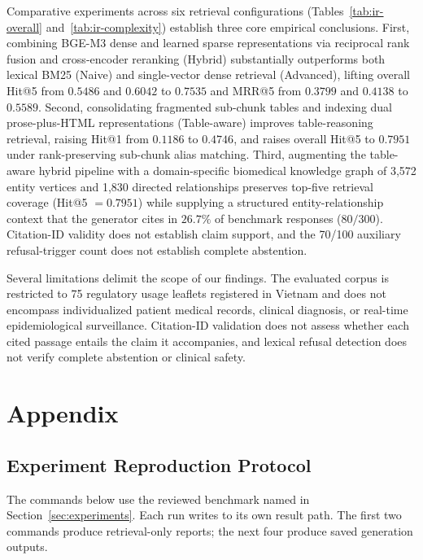 \documentclass[sn-mathphys, oneside]{sn-jnl}
\begin{document}
Comparative experiments across six retrieval configurations (Tables~\ref{tab:ir-overall} and~\ref{tab:ir-complexity}) establish three core empirical conclusions. First, combining BGE-M3 dense and learned sparse representations via reciprocal rank fusion and cross-encoder reranking (Hybrid) substantially outperforms both lexical BM25 (Naive) and single-vector dense retrieval (Advanced), lifting overall Hit@5 from $0.5486$ and $0.6042$ to $0.7535$ and MRR@5 from $0.3799$ and $0.4138$ to $0.5589$. Second, consolidating fragmented sub-chunk tables and indexing dual prose-plus-HTML representations (Table-aware) improves table-reasoning retrieval, raising Hit@1 from $0.1186$ to $0.4746$, and raises overall Hit@5 to $0.7951$ under rank-preserving sub-chunk alias matching. Third, augmenting the table-aware hybrid pipeline with a domain-specific biomedical knowledge graph of 3,572 entity vertices and 1,830 directed relationships preserves top-five retrieval coverage (Hit@5 $= 0.7951$) while supplying a structured entity-relationship context that the generator cites in $26.7\%$ of benchmark responses ($80/300$). Citation-ID validity does not establish claim support, and the 70/100 auxiliary refusal-trigger count does not establish complete abstention.

Several limitations delimit the scope of our findings. The evaluated corpus is restricted to 75 regulatory usage leaflets registered in Vietnam and does not encompass individualized patient medical records, clinical diagnosis, or real-time epidemiological surveillance. Citation-ID validation does not assess whether each cited passage entails the claim it accompanies, and lexical refusal detection does not verify complete abstention or clinical safety.




\appendix
\section*{Appendix}
\label{sec:appendix}
\setcounter{subsection}{0}
\renewcommand{\thesubsection}{\Alph{subsection}}
\renewcommand{\theHsubsection}{appendix.\Alph{subsection}}

\subsection{Experiment Reproduction Protocol}
\label{app:experiment_protocol}
The commands below use the reviewed benchmark named in Section~\ref{sec:experiments}. Each run writes to its own result path. The first two commands produce retrieval-only reports; the next four produce saved generation outputs.
\end{document}
